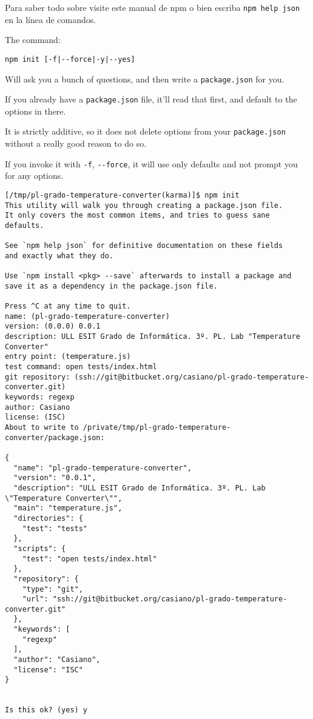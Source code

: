 
Para saber todo sobre 
visite este manual de npm o bien escriba \verb|npm help json| en la línea de comandos.

The command:

\begin{verbatim}
npm init [-f|--force|-y|--yes]
\end{verbatim}

Will ask you a bunch of questions, and then write a \verb|package.json| for you.

If you already have a \verb|package.json| file, it'll read that first, and default to the options in there.

It is strictly additive, so it does not delete options from your \verb|package.json|
without a really good reason to do so.

If you invoke it with \verb|-f|, \verb|--force|, it will use only defaults and not prompt you for any options.

\begin{verbatim}
[/tmp/pl-grado-temperature-converter(karma)]$ npm init
This utility will walk you through creating a package.json file.
It only covers the most common items, and tries to guess sane defaults.

See `npm help json` for definitive documentation on these fields
and exactly what they do.

Use `npm install <pkg> --save` afterwards to install a package and
save it as a dependency in the package.json file.

Press ^C at any time to quit.
name: (pl-grado-temperature-converter) 
version: (0.0.0) 0.0.1
description: ULL ESIT Grado de Informática. 3º. PL. Lab "Temperature Converter"
entry point: (temperature.js) 
test command: open tests/index.html
git repository: (ssh://git@bitbucket.org/casiano/pl-grado-temperature-converter.git) 
keywords: regexp
author: Casiano
license: (ISC) 
About to write to /private/tmp/pl-grado-temperature-converter/package.json:

{
  "name": "pl-grado-temperature-converter",
  "version": "0.0.1",
  "description": "ULL ESIT Grado de Informática. 3º. PL. Lab \"Temperature Converter\"",
  "main": "temperature.js",
  "directories": {
    "test": "tests"
  },
  "scripts": {
    "test": "open tests/index.html"
  },
  "repository": {
    "type": "git",
    "url": "ssh://git@bitbucket.org/casiano/pl-grado-temperature-converter.git"
  },
  "keywords": [
    "regexp"
  ],
  "author": "Casiano",
  "license": "ISC"
}


Is this ok? (yes) y
\end{verbatim}

